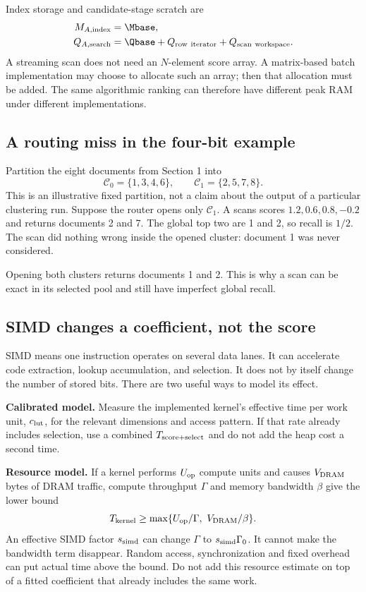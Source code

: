 Index storage and candidate-stage scratch are
\begin{align}
M_{A,\rm index}&=\Mbase,\\
Q_{A,\rm search}&=\Qbase+Q_{\rm row\ iterator}+Q_{\rm scan\ workspace}.
\label{eq:scan-memory}
\end{align}
A streaming scan does not need an $N$-element score array. A matrix-based batch implementation
may choose to allocate such an array; then that allocation must be added. The same algorithmic
ranking can therefore have different peak RAM under different implementations.

\subsection{A routing miss in the four-bit example}
Partition the eight documents from Section 1 into
\[
\mathcal C_0=\{1,3,4,6\},\qquad \mathcal C_1=\{2,5,7,8\}.
\]
This is an illustrative fixed partition, not a claim about the output of a particular
clustering run. Suppose the router opens only $\mathcal C_1$. A scans scores
$1.2,0.6,0.8,-0.2$ and returns documents 2 and 7. The global top two are 1 and 2, so recall is
$1/2$. The scan did nothing wrong inside the opened cluster: document 1 was never considered.

Opening both clusters returns documents 1 and 2. This is why a scan can be exact in its selected
pool and still have imperfect global recall.

\subsection{SIMD changes a coefficient, not the score}
SIMD means one instruction operates on several data lanes. It can accelerate code extraction,
lookup accumulation, and selection. It does not by itself change the number of stored bits.
There are two useful ways to model its effect.

\textbf{Calibrated model.} Measure the implemented kernel's effective time per work unit,
$c_{\rm lut}$, for the relevant dimensions and access pattern. If that rate already includes
selection, use a combined $T_{\rm score+select}$ and do not add the heap cost a second time.

\textbf{Resource model.} If a kernel performs $U_{\rm op}$ compute units and causes $V_{\rm DRAM}$ bytes of DRAM
traffic, compute throughput $\Gamma$ and memory bandwidth $\beta$ give the lower bound
\begin{equation}
T_{\rm kernel}\geq\max\{U_{\rm op}/\Gamma,\ V_{\rm DRAM}/\beta\}.
\label{eq:resource}
\end{equation}
An effective SIMD factor $s_{\rm simd}$ can change $\Gamma$ to $s_{\rm simd}\Gamma_0$.
It cannot make the bandwidth term disappear. Random access, synchronization and fixed overhead
can put actual time above the bound. Do not add this resource estimate on top of a fitted
coefficient that already includes the same work.

